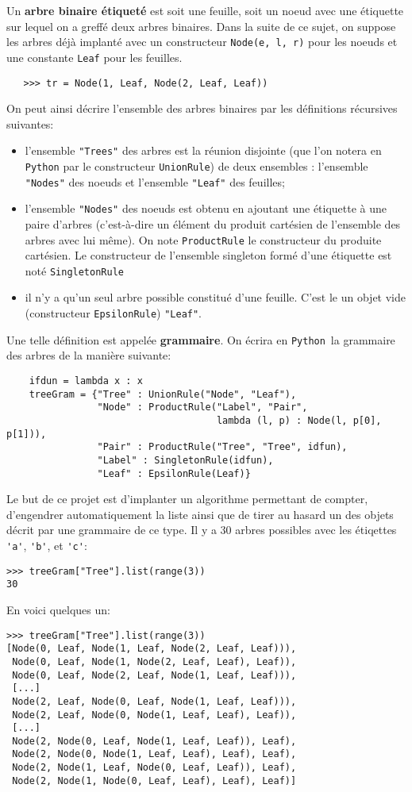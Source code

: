 \documentclass[11pt]{article}
\renewcommand{\emph}[1]{\textbf{#1}}
\newcommand{\Python}{\texttt{Python}}
\begin{document}
Un \emph{arbre binaire étiqueté} est soit une feuille, soit un noeud avec une
étiquette sur lequel on a greffé deux arbres binaires. Dans la suite
de ce sujet, on suppose les arbres déjà implanté avec un constructeur
\texttt{Node(e, l, r)} pour les noeuds et une constante \texttt{Leaf} pour les
feuilles.
\begin{verbatim}
   >>> tr = Node(1, Leaf, Node(2, Leaf, Leaf))
\end{verbatim}
On peut ainsi décrire l'ensemble des arbres binaires par les définitions
récursives suivantes:
\begin{itemize}
\item l'ensemble \texttt{"Trees"} des arbres est la réunion disjointe (que
  l'on notera en \Python{} par le constructeur \texttt{UnionRule}) de deux
  ensembles : l'ensemble \texttt{"Nodes"} des noeuds et l'ensemble
  \texttt{"Leaf"} des feuilles;
\item l'ensemble \texttt{"Nodes"} des noeuds est obtenu en ajoutant une
  étiquette à une paire d'arbres (c'est-à-dire un élément du produit cartésien
  de l'ensemble des arbres avec lui même). On note \texttt{ProductRule} le
  constructeur du produite cartésien. Le constructeur de l'ensemble singleton
  formé d'une étiquette est noté \texttt{SingletonRule} 
\item il n'y a qu'un seul arbre possible constitué d'une feuille. C'est le
  un objet vide (constructeur \texttt{EpsilonRule}) \texttt{"Leaf"}.
\end{itemize}
Une telle définition est appelée \emph{grammaire}. On écrira en
\Python\ la grammaire des arbres de la manière suivante:
\begin{verbatim}
    ifdun = lambda x : x
    treeGram = {"Tree" : UnionRule("Node", "Leaf"),
                "Node" : ProductRule("Label", "Pair",
                                     lambda (l, p) : Node(l, p[0], p[1])),
                "Pair" : ProductRule("Tree", "Tree", idfun),
                "Label" : SingletonRule(idfun),
                "Leaf" : EpsilonRule(Leaf)}
\end{verbatim}
Le but de ce projet est d'implanter un algorithme permettant de compter,
d'engendrer automatiquement la liste ainsi que de tirer au hasard un des
objets décrit par une grammaire de ce type. Il y a 30 arbres
possibles avec les étiqettes \verb|'a'|, \verb|'b'|, et \verb|'c'|:
\begin{verbatim}
>>> treeGram["Tree"].list(range(3))
30
\end{verbatim}
En voici
quelques un:
\begin{verbatim}
>>> treeGram["Tree"].list(range(3))
[Node(0, Leaf, Node(1, Leaf, Node(2, Leaf, Leaf))),
 Node(0, Leaf, Node(1, Node(2, Leaf, Leaf), Leaf)),
 Node(0, Leaf, Node(2, Leaf, Node(1, Leaf, Leaf))),
 [...]
 Node(2, Leaf, Node(0, Leaf, Node(1, Leaf, Leaf))),
 Node(2, Leaf, Node(0, Node(1, Leaf, Leaf), Leaf)),
 [...]
 Node(2, Node(0, Leaf, Node(1, Leaf, Leaf)), Leaf),
 Node(2, Node(0, Node(1, Leaf, Leaf), Leaf), Leaf),
 Node(2, Node(1, Leaf, Node(0, Leaf, Leaf)), Leaf),
 Node(2, Node(1, Node(0, Leaf, Leaf), Leaf), Leaf)]
\end{verbatim}
\end{document}
